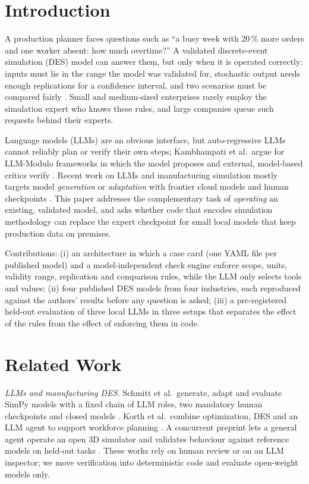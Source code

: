 \documentclass[conference]{IEEEtran}
\begin{document}
\section{Introduction}
A production planner faces questions such as ``a busy week with 20\,\% more orders and one worker absent: how much overtime?'' A validated discrete-event simulation (DES) model can answer them, but only when it is operated correctly: inputs must lie in the range the model was validated for, stochastic output needs enough replications for a confidence interval, and two scenarios must be compared fairly \cite{law2015,sargent2013}. Small and medium-sized enterprises rarely employ the simulation expert who knows these rules, and large companies queue such requests behind their experts.

Language models (LLMs) are an obvious interface, but auto-regressive LLMs cannot reliably plan or verify their own steps; Kambhampati et al.\ argue for LLM-Modulo frameworks in which the model proposes and external, model-based critics verify \cite{kambhampati2024}. Recent work on LLMs and manufacturing simulation mostly targets model \emph{generation} or \emph{adaptation} with frontier cloud models and human checkpoints \cite{schmitt2026,korth2026}. This paper addresses the complementary task of \emph{operating} an existing, validated model, and asks whether code that encodes simulation methodology can replace the expert checkpoint for small local models that keep production data on premises.

Contributions: (i) an architecture in which a case card (one YAML file per published model) and a model-independent check engine enforce scope, units, validity range, replication and comparison rules, while the LLM only selects tools and values; (ii) four published DES models from four industries, each reproduced against the authors' results before any question is asked; (iii) a pre-registered held-out evaluation of three local LLMs in three setups that separates the effect of the rules from the effect of enforcing them in code.

\section{Related Work}
\emph{LLMs and manufacturing DES.} Schmitt et al.\ generate, adapt and evaluate SimPy models with a fixed chain of LLM roles, two mandatory human checkpoints and closed models \cite{schmitt2026}. Korth et al.\ combine optimization, DES and an LLM agent to support workforce planning \cite{korth2026}. A concurrent preprint lets a general agent operate an open 3D simulator and validates behaviour against reference models on held-out tasks \cite{agenticdes2026}. These works rely on human review or on an LLM inspector; we move verification into deterministic code and evaluate open-weight models only.
\end{document}
